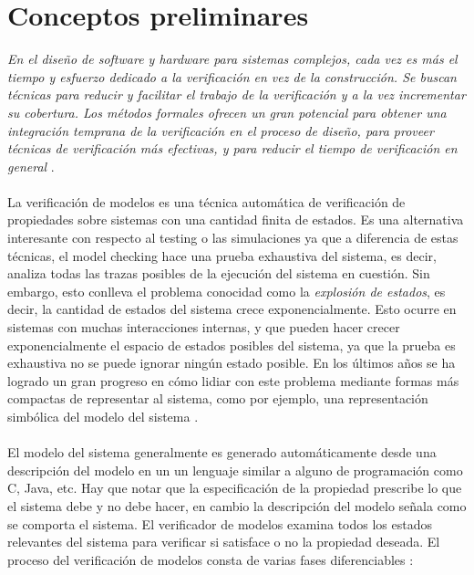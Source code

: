 \chapter{Conceptos preliminares}

\textit{En el diseño de software y hardware para sistemas complejos, cada vez es más el tiempo y esfuerzo dedicado a la verificación en vez de la construcción. Se buscan técnicas para reducir y facilitar el trabajo de la verificación y a la vez incrementar su cobertura. Los métodos formales ofrecen un gran potencial para obtener una integración temprana de la verificación en el proceso de diseño, para proveer técnicas de verificación más efectivas, y para reducir el tiempo de verificación en general} \cite{Baier:2}.\\
\\
La verificación de modelos es una técnica automática de verificación de propiedades sobre sistemas con una cantidad finita de estados. Es una alternativa interesante con respecto al testing o las simulaciones ya que a diferencia de estas técnicas, el model checking hace una prueba exhaustiva del sistema, es decir, analiza todas las trazas posibles de la ejecución del sistema en cuestión. Sin embargo, esto conlleva el problema conocidad como la \emph{explosión de estados}, es decir, la cantidad de estados del sistema crece exponencialmente. Esto ocurre en sistemas con muchas interacciones internas, y que pueden hacer crecer exponencialmente el espacio de estados posibles del sistema, ya que la prueba es exhaustiva no se puede ignorar ningún estado posible. En los últimos años se ha logrado un gran progreso en cómo lidiar con este problema mediante formas más compactas de representar al sistema, como por ejemplo, una representación simbólica del modelo del sistema \cite{Bryant:8} \cite{Burch:4}.\\
\\
El modelo del sistema generalmente es generado automáticamente desde una descripción del modelo en un un lenguaje similar a alguno de programación como C, Java, etc. Hay que notar que la especificación de la propiedad prescribe lo que el sistema debe y no debe hacer, en cambio la descripción del modelo señala como se comporta el sistema. El verificador de modelos examina todos los estados relevantes del sistema para verificar si satisface o no la propiedad deseada. El proceso del verificación de modelos consta de varias fases diferenciables \cite{Baier:2}:\\
